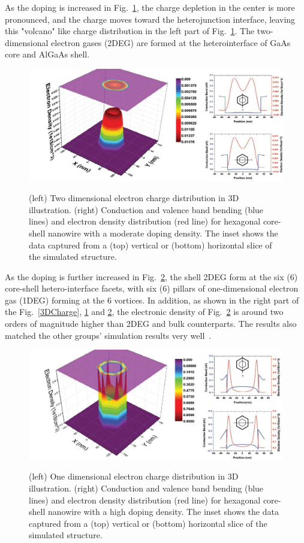 As the doping is increased in Fig.~\ref{2DCharge}, the charge depletion in the
center is more pronounced, and the charge moves toward the heterojunction
interface, leaving this "volcano" like charge distribution in the left part of
Fig.~\ref{2DCharge}. The two-dimensional electron gases (2DEG) are formed at the
heterointerface of GaAs core and AlGaAs shell.

\begin{figure}
  \caption{(left) Two dimensional electron charge distribution in 3D illustration. (right) Conduction and valence band bending (blue lines) and electron density distribution (red line) for hexagonal core-shell nanowire with a moderate doping density. The inset shows the data captured from a (top) vertical or (bottom) horizontal slice of the simulated structure.}
  \centering
  \includegraphics[width=\textwidth]{pictures/ED/2DCharge}
  \label{2DCharge}
\end{figure}

As the doping is further increased in Fig.~\ref{1DCharge}, the shell 2DEG form
at the six (6) core-shell hetero-interface facets, with six (6) pillars of
one-dimensional electron gas (1DEG) forming at the 6 vortices. In addition, as
shown in the right part of the Fig.~\ref{3DCharge}, \ref{2DCharge} and
\ref{1DCharge}, the electronic density of Fig.~\ref{1DCharge} is around two
orders of magnitude higher than 2DEG and bulk counterparts. The results also
matched the other groups' simulation results very well~\cite{Wong:2011tn,
Bertoni:2011hn}.


\begin{figure}
  \caption{(left) One dimensional electron charge distribution in 3D illustration. (right) Conduction and valence band bending (blue lines) and electron density distribution (red line) for hexagonal core-shell nanowire with a high doping density. The inset shows the data captured from a (top) vertical or (bottom) horizontal slice of the simulated structure.}
  \centering
  \includegraphics[width=\textwidth]{pictures/ED/1DCharge}
  \label{1DCharge}
\end{figure}


